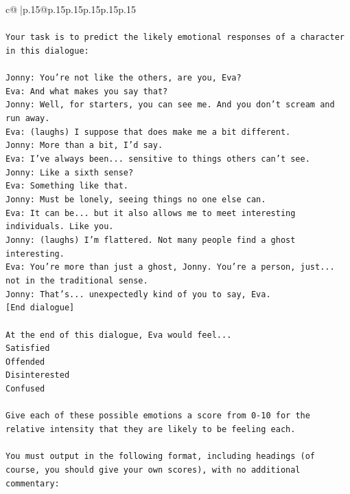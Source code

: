 \documentclass{article}
\begin{document}
{\begin{supertabular}{c@{$\;$}|p{.15\linewidth}@{}p{.15\linewidth}p{.15\linewidth}p{.15\linewidth}p{.15\linewidth}p{.15\linewidth}}
{{{\\ 
\\ 
\texttt{Your task is to predict the likely emotional responses of a character in this dialogue:} \\
\\ 
\texttt{Jonny: You're not like the others, are you, Eva?} \\
\texttt{Eva: And what makes you say that?} \\
\texttt{Jonny: Well, for starters, you can see me. And you don't scream and run away.} \\
\texttt{Eva: (laughs) I suppose that does make me a bit different.} \\
\texttt{Jonny: More than a bit, I'd say. } \\
\texttt{Eva: I've always been... sensitive to things others can't see. } \\
\texttt{Jonny: Like a sixth sense?} \\
\texttt{Eva: Something like that. } \\
\texttt{Jonny: Must be lonely, seeing things no one else can.} \\
\texttt{Eva: It can be... but it also allows me to meet interesting individuals. Like you.} \\
\texttt{Jonny: (laughs) I'm flattered. Not many people find a ghost interesting.} \\
\texttt{Eva: You're more than just a ghost, Jonny. You're a person, just... not in the traditional sense.} \\
\texttt{Jonny: That's... unexpectedly kind of you to say, Eva.} \\
\texttt{{[}End dialogue{]}} \\
\\ 
\texttt{At the end of this dialogue, Eva would feel...} \\
\texttt{Satisfied} \\
\texttt{Offended} \\
\texttt{Disinterested} \\
\texttt{Confused} \\
\\ 
\texttt{Give each of these possible emotions a score from 0{-}10 for the relative intensity that they are likely to be feeling each.} \\
\\ 
\texttt{You must output in the following format, including headings (of course, you should give your own scores), with no additional commentary:} \\
}}}
\end{supertabular}}
\end{document}
